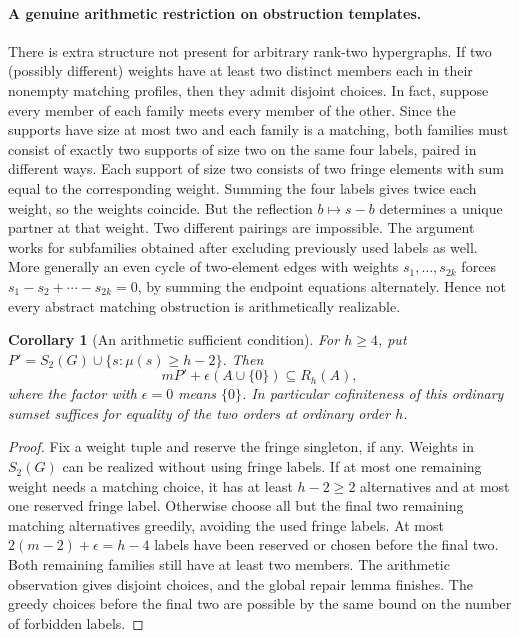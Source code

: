 \documentclass[11pt]{article}
\newtheorem{corollary}[theorem]{Corollary}
\theoremstyle{remark}\newtheorem{remark}[theorem]{Remark}
\begin{document}
\paragraph{A genuine arithmetic restriction on obstruction templates.}
There is extra structure not present for arbitrary rank-two hypergraphs. If two (possibly different) weights have at least two distinct members each in their nonempty matching profiles, then they admit disjoint choices. In fact, suppose every member of each family meets every member of the other. Since the supports have size at most two and each family is a matching, both families must consist of exactly two supports of size two on the same four labels, paired in different ways. Each support of size two consists of two fringe elements with sum equal to the corresponding weight. Summing the four labels gives twice each weight, so the weights coincide. But the reflection $b\mapsto s-b$ determines a unique partner at that weight. Two different pairings are impossible. The argument works for subfamilies obtained after excluding previously used labels as well. More generally an even cycle of two-element edges with weights $s_1,\ldots,s_{2k}$ forces $s_1-s_2+\cdots-s_{2k}=0$, by summing the endpoint equations alternately. Hence not every abstract matching obstruction is arithmetically realizable.

\begin{corollary}[An arithmetic sufficient condition]\label{cor:pairrich}
For $h\ge4$, put $P'=S_2(G)\cup\{s:\mu(s)\ge h-2\}$. Then
\[
 mP'+\epsilon(A\cup\{0\})\subseteq R_h(A),
\]
where the factor with $\epsilon=0$ means $\{0\}$. In particular cofiniteness of this ordinary sumset suffices for equality of the two orders at ordinary order $h$.
\end{corollary}
\begin{proof}
Fix a weight tuple and reserve the fringe singleton, if any. Weights in $S_2(G)$ can be realized without using fringe labels. If at most one remaining weight needs a matching choice, it has at least $h-2\ge2$ alternatives and at most one reserved fringe label. Otherwise choose all but the final two remaining matching alternatives greedily, avoiding the used fringe labels. At most $2(m-2)+\epsilon=h-4$ labels have been reserved or chosen before the final two. Both remaining families still have at least two members. The arithmetic observation gives disjoint choices, and the global repair lemma finishes. The greedy choices before the final two are possible by the same bound on the number of forbidden labels.
\end{proof}
\end{document}
